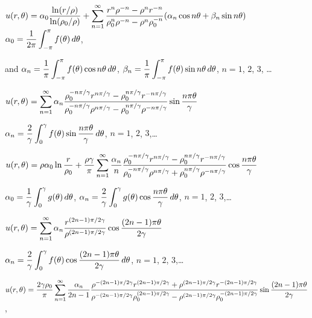 \medskip

$u(r,\theta)=\displaystyle\alpha_{0}\frac{\ln (r/\rho)}{\ln(\rho_{0}/\rho)}+
\sum_{n=1}^{\infty}
\frac{r^{n}\rho^{-n}-\rho^{n}r^{-n}}{\rho_{0}^{n}\rho^{-n}-\rho^{n}\rho_{0}^{-n}}
(\alpha_{n}\cos
n\theta+\beta_{n}\sin n\theta)$
$\displaystyle\alpha_{0}=\frac{1}{2\pi}\int_{-\pi}^{\pi}f(\theta)\,d\theta$,

\quad\quad and
$\displaystyle\alpha_{n}=\frac{1}{\pi}\int_{-\pi}^{\pi}f(\theta)\cos
n\theta\,d\theta$,\quad
$\displaystyle\beta_{n}=\frac{1}{\pi}\int_{-\pi}^{\pi}f(\theta)\sin
n\theta\,d\theta$,\;
 $n=1$, $2$, $3$, \dots

$\displaystyle u(r,\theta)=\sum_{n=1}^{\infty}\alpha_{n}
\displaystyle\frac{\rho_{0}^{-n\pi/\gamma}r^{n\pi/\gamma}-\rho_{0}^{n\pi/\gamma}
r^{-n\pi/\gamma}}{\rho_{0}^{-n\pi/\gamma}\rho^{n\pi/\gamma}-\rho_{0}^{n\pi/\gamma}
\rho^{-n\pi/\gamma}}
\sin\frac{n\pi\theta}{\gamma}$   \quad

\quad \quad
$\alpha_{n}=\displaystyle\frac{2}{\gamma}\int_{0}^{\gamma}
f(\theta)\sin\frac{n\pi\theta}{\gamma}\,d\theta$, $n=1$, $2$,
$3$,\dots

$\displaystyle u(r,\theta)=
\rho\alpha_{0}\displaystyle\ln\frac{r}{\rho_{0}}+\frac{\rho\gamma}{\pi}\sum_{n=1}^{\infty}\frac{\alpha_{n}}{n}
\displaystyle\frac{\rho_{0}^{-n\pi/\gamma}r^{n\pi/\gamma}-\rho_{0}^{n\pi/\gamma}
r^{-n\pi/\gamma}}{\rho_{0}^{-n\pi/\gamma}\rho^{n\pi/\gamma}+\rho_{0}^{n\pi/\gamma}
\rho^{-n\pi/\gamma}}
\displaystyle\cos\frac{n\pi\theta}{\gamma}$

\quad \quad $\alpha_{0}=\displaystyle\frac{1}{\gamma}\int_{0}^{\gamma}
g(\theta)\,d\theta$,\quad
$\alpha_{n}=\displaystyle\frac{2}{\gamma}\int_{0}^{\gamma}
g(\theta)\cos\frac{n\pi\theta}{\gamma}\,d\theta$, $n=1$, $2$,
$3$,\dots

$u(r,\theta)=\displaystyle\sum_{n=1}^{\infty}\alpha_{n}
\displaystyle\frac{r^{(2n-1)\pi/2\gamma}}{\rho^{(2n-1)\pi/2\gamma}}
\cos\frac{(2n-1)\pi\theta}{2\gamma}$  \quad

\quad \quad
$\alpha_{n}=\displaystyle\frac{2}{\gamma}\int_{0}^{\gamma}
f(\theta)\cos\frac{(2n-1)\pi\theta}{2\gamma}\,d\theta$,\;
  $n=1$, $2$, $3$,\dots

$u(r,\theta)=\displaystyle\frac{2\gamma\rho_{0}}{\pi}\sum_{n=1}^{\infty}
\frac{\alpha_{n}}{2n-1}
\frac{\rho^{-(2n-1)\pi/2\gamma}r^{(2n-1)\pi/2\gamma}+
\rho^{(2n-1)\pi/2\gamma}r^{-(2n-1)\pi/2\gamma}}{\rho^{-(2n-1)\pi/2\gamma}\rho_{0}^{(2n-1)\pi/2\gamma}-
\rho^{(2n-1)\pi/2\gamma}\rho_{0}^{-(2n-1)\pi/2\gamma}}
\displaystyle\sin\frac{(2n-1)\pi\theta}{2\gamma}$,

